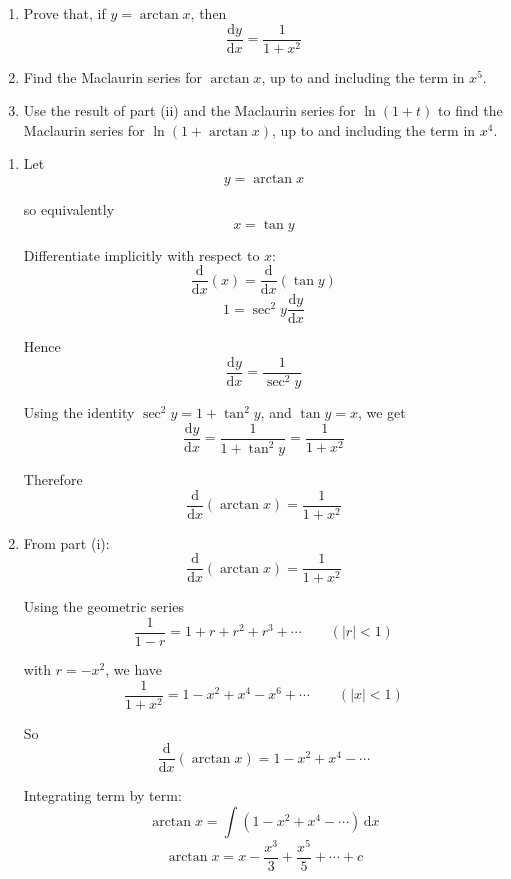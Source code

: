 \documentclass[leqno]{article}
\begin{document}
\begin{enumerate}[
  label=\textbf{\arabic*.},
  leftmargin=*,
  topsep=0pt,
  partopsep=0pt,
  parsep=0pt
]
\begin{enumerate}[label=\textbf{(\roman*)}]
  \item Prove that, if $y=\arctan x$, then
  \[
  \frac{\mathrm{d}y}{\mathrm{d}x}=\frac{1}{1+x^2}
  \]
  \item Find the Maclaurin series for $\arctan x$, up to and including the term in $x^5$.  \\
  \item Use the result of part (ii) and the Maclaurin series for $\ln(1+t)$ to find the Maclaurin series for $\ln(1+\arctan x)$, up to and including the term in $x^4$.  \\
\end{enumerate}

\vspace*{10pt}

\begin{djsSolution}
\begin{enumerate}[label=\textbf{(\roman*)}]
  \item Let
  \[
  y=\arctan x
  \]

  so equivalently
  \[
  x=\tan y
  \]

  Differentiate implicitly with respect to $x$:
  \[
  \frac{\mathrm{d}}{\mathrm{d}x}(x)=\frac{\mathrm{d}}{\mathrm{d}x}(\tan y)
  \]
  \[
  1=\sec^2 y\frac{\mathrm{d}y}{\mathrm{d}x}
  \]

  Hence
  \[
  \frac{\mathrm{d}y}{\mathrm{d}x}=\frac{1}{\sec^2 y}
  \]

  Using the identity $\sec^2 y=1+\tan^2 y$, and $\tan y=x$, we get
  \[
  \frac{\mathrm{d}y}{\mathrm{d}x}=\frac{1}{1+\tan^2 y}=\frac{1}{1+x^2}
  \]

  Therefore
  \[
  \frac{\mathrm{d}}{\mathrm{d}x}(\arctan x)=\frac{1}{1+x^2}
  \]

  \item From part (i):
  \[
  \frac{\mathrm{d}}{\mathrm{d}x}(\arctan x)=\frac{1}{1+x^2}
  \]

  Using the geometric series
  \[
  \frac{1}{1-r}=1+r+r^2+r^3+\cdots \qquad (|r|<1)
  \]

  with $r=-x^2$, we have
  \[
  \frac{1}{1+x^2}=1-x^2+x^4-x^6+\cdots \qquad (|x|<1)
  \]

  So
  \[
  \frac{\mathrm{d}}{\mathrm{d}x}(\arctan x)=1-x^2+x^4-\cdots
  \]

  Integrating term by term:
  \[
  \arctan x=\int (1-x^2+x^4-\cdots)\,\mathrm{d}x
  \]
  \[
  \arctan x=x-\frac{x^3}{3}+\frac{x^5}{5}+\cdots +c
  \]


\end{enumerate}
\end{djsSolution}
\end{enumerate}
\end{document}
